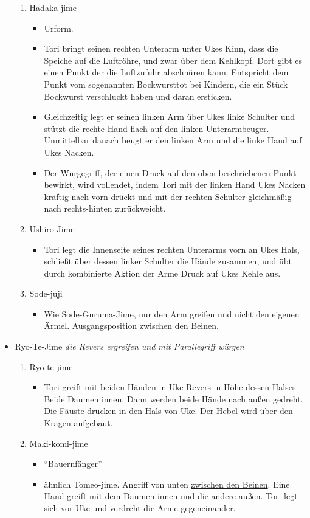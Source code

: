 \documentclass[justified, a4paper, notitlepage, captions=tableheading, nobib]{tufte-handout}
\begin{document}
\begin{itemize}
\begin{enumerate}
\item Hadaka-jime 
\begin{itemize}
\item Urform.
\item Tori bringt seinen rechten Unterarm unter Ukes Kinn, dass die Speiche auf die Luftröhre, und zwar über dem Kehlkopf. Dort gibt es einen Punkt der die Luftzufuhr abschnüren kann. Entspricht dem Punkt vom sogenannten Bockwursttot bei Kindern, die ein Stück Bockwurst verschluckt haben und daran ersticken.
\item Gleichzeitig legt er seinen linken Arm über Ukes linke Schulter und stützt die rechte Hand flach auf den linken Unterarmbeuger. Unmittelbar danach beugt er den linken Arm und die linke Hand auf Ukes Nacken.
\item Der Würgegriff, der einen Druck auf den oben beschriebenen Punkt bewirkt, wird vollendet, indem Tori mit der linken Hand Ukes Nacken kräftig nach vorn drückt und mit der rechten Schulter gleichmäßig nach rechts-hinten zurückweicht.
\end{itemize}

\item Ushiro-Jime 
\begin{itemize}
\item Tori legt die Innenseite seines rechten Unterarms vorn an Ukes Hals, schließt über dessen linker Schulter die Hände zusammen, und übt durch kombinierte Aktion der Arme Druck auf Ukes Kehle aus.
\end{itemize}
\item Sode-juji 
\begin{itemize}
\item Wie Sode-Guruma-Jime, nur den Arm greifen und nicht den eigenen Ärmel. Ausgangsposition \hyperref[orga527e99]{zwischen den Beinen}.
\end{itemize}
\end{enumerate}

\item Ryo-Te-Jime 
\emph{die Revers ergreifen und mit Parallegriff würgen}

\begin{enumerate}
\item Ryo-te-jime 
\begin{itemize}
\item Tori  greift mit beiden Händen in Uke Revers in Höhe dessen Halses. Beide Daumen innen. Dann werden beide Hände nach außen gedreht. Die Fäuste drücken in den Hals von Uke. Der Hebel wird über den Kragen aufgebaut.
\end{itemize}
\item Maki-komi-jime
\begin{itemize}
\item "`Bauernfänger"'
\item ähnlich Tomeo-jime. Angriff von unten \hyperref[orga527e99]{zwischen den Beinen}. Eine Hand greift mit dem Daumen innen und die andere außen. Tori legt sich vor Uke und verdreht die Arme gegeneinander.
\end{itemize}
\end{enumerate}


\end{itemize}
\end{document}
